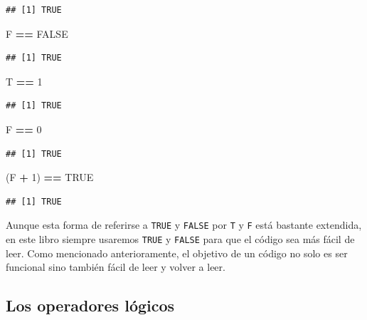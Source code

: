 \documentclass[]{book}
\newenvironment{Shaded}{\begin{snugshade}}{\end{snugshade}}
\newcommand{\DecValTok}[1]{\textcolor[rgb]{0.00,0.00,0.81}{#1}}
\newcommand{\StringTok}[1]{\textcolor[rgb]{0.31,0.60,0.02}{#1}}
\newcommand{\OtherTok}[1]{\textcolor[rgb]{0.56,0.35,0.01}{#1}}
\newcommand{\OperatorTok}[1]{\textcolor[rgb]{0.81,0.36,0.00}{\textbf{#1}}}
\newcommand{\NormalTok}[1]{#1}
\begin{document}
\begin{verbatim}
## [1] TRUE
\end{verbatim}

\begin{Shaded}
\begin{Highlighting}[]
\NormalTok{F }\OperatorTok{==}\StringTok{ }\OtherTok{FALSE}
\end{Highlighting}
\end{Shaded}

\begin{verbatim}
## [1] TRUE
\end{verbatim}

\begin{Shaded}
\begin{Highlighting}[]
\NormalTok{T }\OperatorTok{==}\StringTok{ }\DecValTok{1}
\end{Highlighting}
\end{Shaded}

\begin{verbatim}
## [1] TRUE
\end{verbatim}

\begin{Shaded}
\begin{Highlighting}[]
\NormalTok{F }\OperatorTok{==}\StringTok{ }\DecValTok{0}
\end{Highlighting}
\end{Shaded}

\begin{verbatim}
## [1] TRUE
\end{verbatim}

\begin{Shaded}
\begin{Highlighting}[]
\NormalTok{(F }\OperatorTok{+}\StringTok{ }\DecValTok{1}\NormalTok{) }\OperatorTok{==}\StringTok{ }\OtherTok{TRUE}
\end{Highlighting}
\end{Shaded}

\begin{verbatim}
## [1] TRUE
\end{verbatim}

Aunque esta forma de referirse a \texttt{TRUE} y \texttt{FALSE} por
\texttt{T} y \texttt{F} está bastante extendida, en este libro siempre
usaremos \texttt{TRUE} y \texttt{FALSE} para que el código sea más fácil
de leer. Como mencionado anterioramente, el objetivo de un código no
solo es ser funcional sino también fácil de leer y volver a leer.

\subsection{Los operadores lógicos}\label{los-operadores-logicos}
\end{document}
